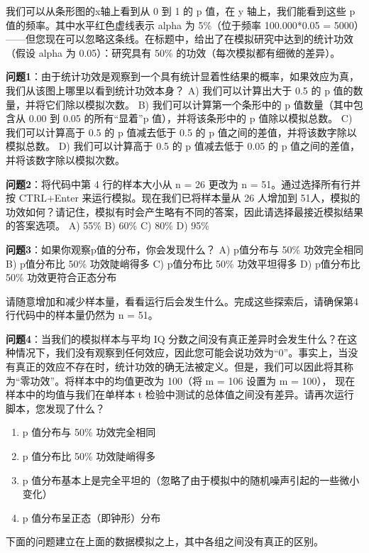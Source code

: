 \documentclass[
  letterpaper,
  DIV=11,
  numbers=noendperiod]{scrreprt}
\providecommand{\tightlist}{%
  \setlength{\itemsep}{0pt}\setlength{\parskip}{0pt}}\usepackage{longtable,booktabs,array}
\begin{document}
我们可以从条形图的x轴上看到从 0 到 1 的 p 值，在 y 轴上，我们能看到这些
p 值的频率。其中水平红色虚线表示 alpha 为 5\%（位于频率 100.000*0.05 =
5000）------但您现在可以忽略这条线。在标题中，给出了在模拟研究中达到的统计功效（假设
alpha 为 0.05）：研究具有 50\% 的功效（每次模拟都有细微的差异）。

\textbf{问题1}：由于统计功效是观察到一个具有统计显着性结果的概率，如果效应为真，我们从该图上哪里以看到统计功效本身？
A) 我们可以计算出大于 0.5 的 p 值的数量，并将它们除以模拟次数。 B)
我们可以计算第一个条形中的 p 值数量（其中包含从 0.00 到 0.05
的所有``显着''p 值），并将该条形中的 p 值除以模拟总数。 C)
我们可以计算高于 0.5 的 p 值减去低于 0.5 的 p
值之间的差值，并将该数字除以模拟总数。 D) 我们可以计算高于 0.5 的 p
值减去低于 0.05 的 p 值之间的差值，并将该数字除以模拟次数。

\textbf{问题2}：将代码中第 4 行的样本大小从 n = 26 更改为 n =
51。通过选择所有行并按 CTRL+Enter 来运行模拟。现在我们已将样本量从 26
人增加到
51人，模拟的功效如何？请记住，模拟有时会产生略有不同的答案，因此请选择最接近模拟结果的答案选项。
A) 55\% B) 60\% C) 80\% D) 95\%

\textbf{问题3}：如果你观察p值的分布，你会发现什么？ A) p值分布与 50\%
功效完全相同 B) p值分布比 50\% 功效陡峭得多 C) p值分布比 50\%
功效平坦得多 D) p值分布比 50\% 功效更符合正态分布

请随意增加和减少样本量，看看运行后会发生什么。完成这些探索后，请确保第4行代码中的样本量仍然为
n = 51。

\textbf{问题4}：当我们的模拟样本与平均 IQ
分数之间没有真正差异时会发生什么？在这种情况下，我们没有观察到任何效应，因此您可能会说功效为``0''。事实上，当没有真正的效应不存在时，统计功效的确无法被定义。但是，我们可以因此将其称为``零功效''。将样本中的均值更改为
100（将 m = 106 设置为 m = 100）， 现在样本中的均值与我们在单样本 t
检验中测试的总体值之间没有差异。请再次运行脚本，您发现了什么？

\begin{enumerate}
\def\labelenumi{\Alph{enumi})}
\tightlist
\item
  p 值分布与 50\% 功效完全相同
\item
  p 值分布比 50\% 功效陡峭得多
\item
  p
  值分布基本上是完全平坦的（忽略了由于模拟中的随机噪声引起的一些微小变化）
\item
  p 值分布呈正态（即钟形）分布
\end{enumerate}

下面的问题建立在上面的数据模拟之上，其中各组之间没有真正的区别。
\end{document}
